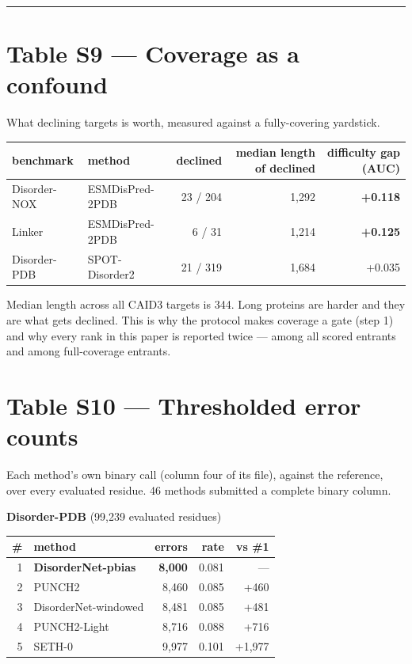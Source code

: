 \vspace{0.5em}\hrule\vspace{0.8em}



\section*{Table S9 --- Coverage as a confound}

What declining targets is worth, measured against a fully-covering yardstick.

\begin{center}\footnotesize
\begin{tabular}{llrrr}
\toprule
\textbf{benchmark} & \textbf{method} & \textbf{declined} & \textbf{median length of declined} & \textbf{difficulty gap (AUC)} \\
\midrule
Disorder-NOX & ESMDisPred-2PDB & 23 / 204 & 1,292 & \textbf{+0.118} \\
Linker & ESMDisPred-2PDB & 6 / 31 & 1,214 & \textbf{+0.125} \\
Disorder-PDB & SPOT-Disorder2 & 21 / 319 & 1,684 & +0.035 \\
\bottomrule
\end{tabular}
\end{center}

Median length across all CAID3 targets is 344. Long proteins are harder and they
are what gets declined. This is why the protocol makes coverage a gate (step 1)
and why every rank in this paper is reported twice --- among all scored entrants
and among full-coverage entrants.


\section*{Table S10 --- Thresholded error counts}

Each method's own binary call (column four of its  file), against the
reference, over every evaluated residue. 46 methods submitted a complete binary
column.

\textbf{Disorder-PDB} (99,239 evaluated residues)

\begin{center}\footnotesize
\begin{tabular}{rlrrr}
\toprule
\textbf{\#} & \textbf{method} & \textbf{errors} & \textbf{rate} & \textbf{vs \#1} \\
\midrule
1 & \textbf{DisorderNet-pbias} & \textbf{8,000} & 0.081 & --- \\
2 & PUNCH2 & 8,460 & 0.085 & +460 \\
3 & DisorderNet-windowed & 8,481 & 0.085 & +481 \\
4 & PUNCH2-Light & 8,716 & 0.088 & +716 \\
5 & SETH-0 & 9,977 & 0.101 & +1,977 \\
\bottomrule
\end{tabular}
\end{center}

